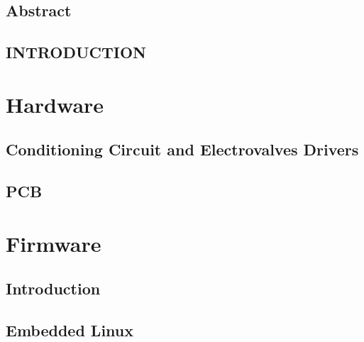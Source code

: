 \documentclass[a4paper,12pt,openany,twoside, abstracton]{book}%
\begin{document}
 \selectfont


\newpage
{}


\linespread{1.5}
\chapter*{Abstract}



\cleardoublepage
\tableofcontents
\cleardoublepage
{}

\chapter*{INTRODUCTION}\label{summary}

\cleardoublepage
\part{Hardware}

\newpage

\chapter{Conditioning Circuit and Electrovalves Drivers}\label{ch:Analog}


\chapter{PCB}\label{cha:PCB}


\part{Firmware}
\chapter{Introduction}\label{ch:IIintroduction}


\chapter{Embedded Linux}\label{ch:firmware}

\end{document}
